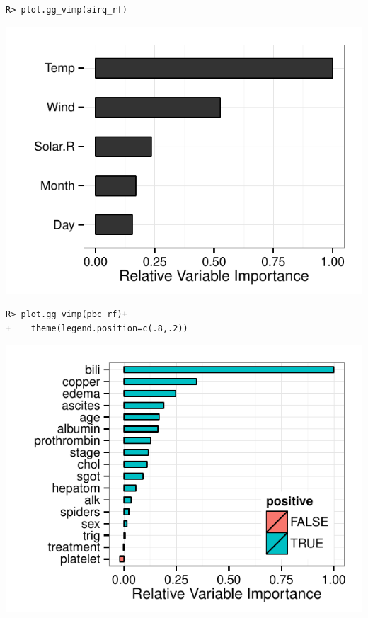 \documentclass[nojss]{jss}\usepackage[]{graphicx}\usepackage[]{color}
\makeatletter
\def\maxwidth{ %
  \ifdim\Gin@nat@width>\linewidth
    \linewidth
  \else
    \Gin@nat@width
  \fi
}
\newenvironment{kframe}{%
 \def\at@end@of@kframe{}%
 \ifinner\ifhmode%
  \def\at@end@of@kframe{\end{minipage}}%
  \begin{minipage}{\columnwidth}%
 \fi\fi%
 \def\FrameCommand##1{\hskip\@totalleftmargin \hskip-\fboxsep
 \colorbox{shadecolor}{##1}\hskip-\fboxsep
     \hskip-\linewidth \hskip-\@totalleftmargin \hskip\columnwidth}%
 \MakeFramed {\advance\hsize-\width
   \@totalleftmargin\z@ \linewidth\hsize
   \@setminipage}}%
 {\par\unskip\endMakeFramed%
 \at@end@of@kframe}
\newenvironment{knitrout}{}{} %
\makeatother
\begin{document}
\begin{knitrout}\footnotesize
{}\color{fgcolor}\begin{kframe}
\begin{verbatim}
R> plot.gg_vimp(airq_rf)
\end{verbatim}
\end{kframe}

{\centering \includegraphics[width=\maxwidth]{figure/vig-airq-vimp-1} 

}



\end{knitrout}

\begin{knitrout}\footnotesize
{}\color{fgcolor}\begin{kframe}
\begin{verbatim}
R> plot.gg_vimp(pbc_rf)+
+    theme(legend.position=c(.8,.2))
\end{verbatim}
\end{kframe}

{\centering \includegraphics[width=\maxwidth]{figure/vig-pbc-vimp-1} 

}



\end{knitrout}
\end{document}
